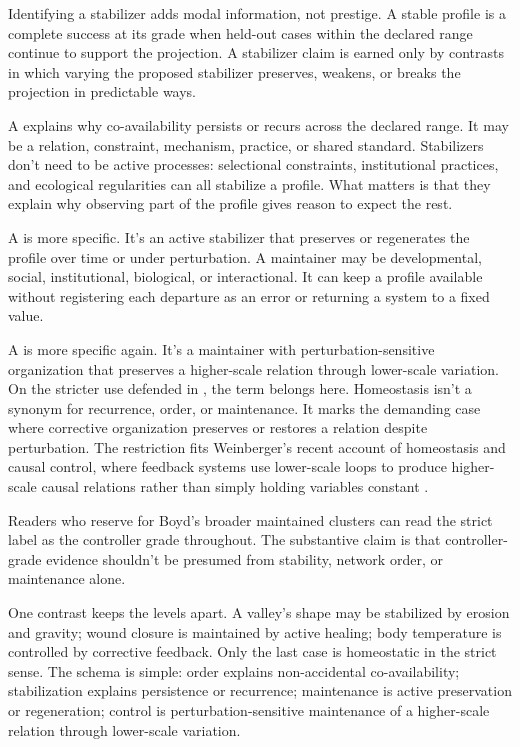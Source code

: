\documentclass[12pt]{article}
\begin{document}
Identifying a stabilizer adds modal information, not prestige. A stable profile
is a complete success at its grade when held-out cases within the declared range
continue to support the projection. A stabilizer claim is earned only by
contrasts in which varying the proposed stabilizer preserves, weakens, or breaks
the projection in predictable ways.

A  explains why co-availability persists or recurs across the
declared range. It may be a relation, constraint, mechanism, practice, or shared
standard. Stabilizers don't need to be active processes: selectional constraints,
institutional practices, and ecological regularities can all stabilize a
profile. What matters is that they explain why observing part of the profile
gives reason to expect the rest.

A  is more specific. It's an active stabilizer that preserves
or regenerates the profile over time or under perturbation. A maintainer may be
developmental, social, institutional, biological, or interactional. It can keep a
profile available without registering each departure as an error or returning a
system to a fixed value.

A  is more specific again. It's a maintainer with
perturbation-sensitive organization that preserves a higher-scale relation
through lower-scale variation. On the stricter use defended in
\textcite{reynolds2026notEveryStableCluster}, the term
 belongs here. Homeostasis isn't a synonym for recurrence,
order, or maintenance. It marks the demanding case where corrective organization
preserves or restores a relation despite perturbation. The restriction fits
Weinberger's recent account of homeostasis and causal control, where feedback
systems use lower-scale loops to produce higher-scale causal relations rather
than simply holding variables constant
\citep{weinberger2026HomeostasisCausalControlBP}.

Readers who reserve  for Boyd's broader maintained clusters
can read the strict label as the controller grade throughout. The substantive
claim is that controller-grade evidence shouldn't be presumed from stability,
network order, or maintenance alone.

One contrast keeps the levels apart. A valley's shape may be stabilized by
erosion and gravity; wound closure is maintained by active healing; body
temperature is controlled by corrective feedback. Only the last case is
homeostatic in the strict sense. The schema is simple: order explains
non-accidental co-availability; stabilization explains persistence or recurrence;
maintenance is active preservation or regeneration; control is
perturbation-sensitive maintenance of a higher-scale relation through
lower-scale variation.
\end{document}
